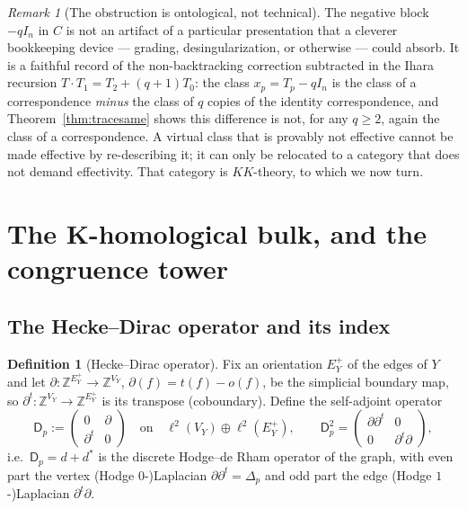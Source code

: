\documentclass[11pt]{amsart}
\numberwithin{equation}{section}
\theoremstyle{definition}
\newtheorem{definition}[theorem]{Definition}
\theoremstyle{remark}
\newtheorem{remark}[theorem]{Remark}
\newcommand{\Z}{\mathbb{Z}}
\begin{document}
\begin{remark}[The obstruction is ontological, not technical]
The negative block $-qI_n$ in $C$ is not an artifact of a particular presentation that a
cleverer bookkeeping device --- grading, desingularization, or otherwise --- could
absorb. It is a faithful record of the non-backtracking correction subtracted in the
Ihara recursion $T\cdot T_1=T_2+(q+1)T_0$: the class $x_p=T_p-qI_n$ is the class of a
correspondence \emph{minus} the class of $q$ copies of the identity correspondence, and
Theorem~\ref{thm:tracesame} shows this difference is not, for any $q\ge2$, again the
class of a correspondence. A virtual class that is provably not effective cannot be made
effective by re-describing it; it can only be relocated to a category that does not
demand effectivity. That category is $KK$-theory, to which we now turn.
\end{remark}

\section{The K-homological bulk, and the congruence tower}\label{sec:tower}

\subsection{The Hecke--Dirac operator and its index}

\begin{definition}[Hecke--Dirac operator]\label{def:dirac}
Fix an orientation $E_Y^+$ of the edges of $Y$ and let
$\partial\colon\Z^{E_Y^+}\to\Z^{V_Y}$, $\partial(f)=t(f)-o(f)$, be the simplicial
boundary map, so $\partial^t\colon\Z^{V_Y}\to\Z^{E_Y^+}$ is its transpose (coboundary).
Define the self-adjoint operator
\[
\mathsf D_p:=\begin{pmatrix}0&\partial\\\partial^t&0\end{pmatrix}\quad\text{on}\quad
\ell^2(V_Y)\oplus\ell^2(E_Y^+),\qquad
\mathsf D_p^2=\begin{pmatrix}\partial\partial^t&0\\0&\partial^t\partial\end{pmatrix},
\]
i.e.\ $\mathsf D_p=d+d^*$ is the discrete Hodge--de Rham operator of the graph, with
even part the vertex (Hodge $0$-)Laplacian $\partial\partial^t=\Delta_p$ and odd part
the edge (Hodge $1$-)Laplacian $\partial^t\partial$.
\end{definition}
\end{document}
